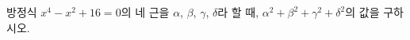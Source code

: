 방정식 $x^4-x^2+16=0$의 네 근을 $\alpha$, $\beta$, $\gamma$, $\delta$라 할 때, $\alpha^2+\beta^2+\gamma^2+\delta^2$의 값을 구하시오.
